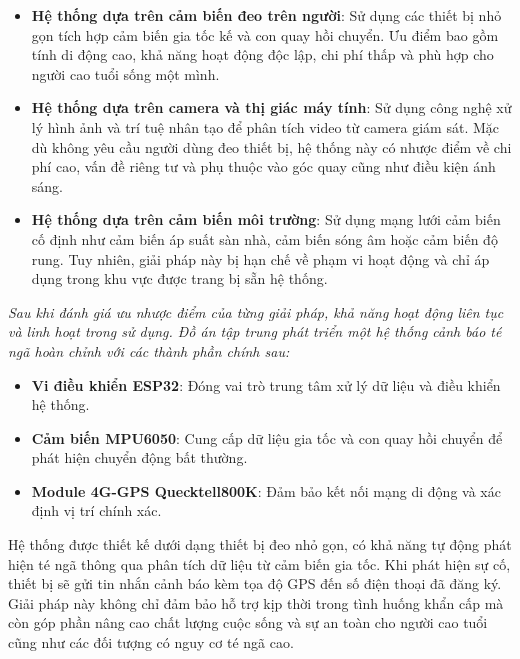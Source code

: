 \documentclass[a4paper,12pt]{report}
\begin{document}
	\begin{itemize}
		\item \textbf{Hệ thống dựa trên cảm biến đeo trên người}: Sử dụng các thiết bị nhỏ gọn tích hợp cảm biến gia tốc kế và con quay hồi chuyển. Ưu điểm bao gồm tính di động cao, khả năng hoạt động độc lập, chi phí thấp và phù hợp cho người cao tuổi sống một mình.
		
		\item \textbf{Hệ thống dựa trên camera và thị giác máy tính}: Sử dụng công nghệ xử lý hình ảnh và trí tuệ nhân tạo để phân tích video từ camera giám sát. Mặc dù không yêu cầu người dùng đeo thiết bị, hệ thống này có nhược điểm về chi phí cao, vấn đề riêng tư và phụ thuộc vào góc quay cũng như điều kiện ánh sáng.
		
		\item \textbf{Hệ thống dựa trên cảm biến môi trường}: Sử dụng mạng lưới cảm biến cố định như cảm biến áp suất sàn nhà, cảm biến sóng âm hoặc cảm biến độ rung. Tuy nhiên, giải pháp này bị hạn chế về phạm vi hoạt động và chỉ áp dụng trong khu vực được trang bị sẵn hệ thống.
		
	\end{itemize}
	
	\textit{Sau khi đánh giá ưu nhược điểm của từng giải pháp, khả năng hoạt động liên tục và linh hoạt trong sử dụng. Đồ án tập trung phát triển một hệ thống cảnh báo té ngã hoàn chỉnh với các thành phần chính sau:}
	
	\begin{itemize}
		\item \textbf{Vi điều khiển ESP32}: Đóng vai trò trung tâm xử lý dữ liệu và điều khiển hệ thống.
		\item \textbf{Cảm biến MPU6050}: Cung cấp dữ liệu gia tốc và con quay hồi chuyển để phát hiện chuyển động bất thường.
		\item \textbf{Module 4G-GPS Quecktell800K}: Đảm bảo kết nối mạng di động và xác định vị trí chính xác.
	\end{itemize}
	
	Hệ thống được thiết kế dưới dạng thiết bị đeo nhỏ gọn, có khả năng tự động phát hiện té ngã thông qua phân tích dữ liệu từ cảm biến gia tốc. Khi phát hiện sự cố, thiết bị sẽ gửi tin nhắn cảnh báo kèm tọa độ GPS đến số điện thoại đã đăng ký. Giải pháp này không chỉ đảm bảo hỗ trợ kịp thời trong tình huống khẩn cấp mà còn góp phần nâng cao chất lượng cuộc sống và sự an toàn cho người cao tuổi cũng như các đối tượng có nguy cơ té ngã cao.
	
	
	
\end{document}
